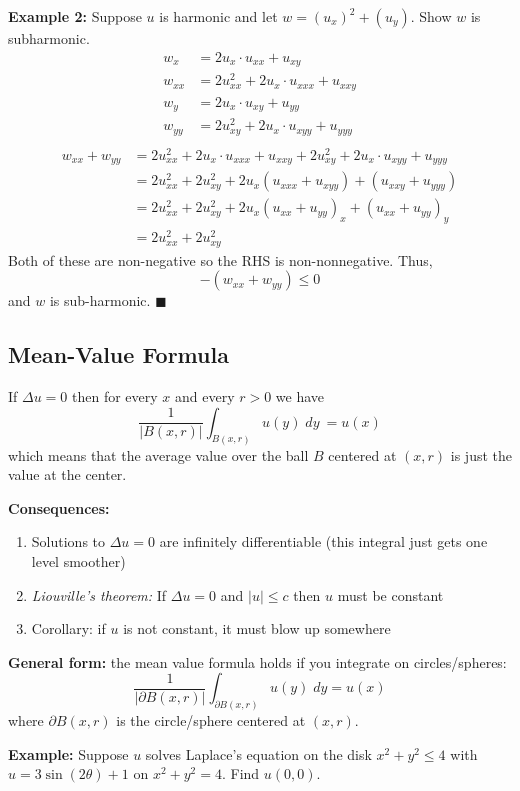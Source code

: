 \documentclass[10pt]{article}
\begin{document}
\textbf{Example 2:} Suppose $u$ is harmonic and let $w = (u_x)^2 + (u_y)$. Show $w$ is subharmonic.
\begin{align*}
    w_x &= 2u_x\cdot u_{xx} + u_{xy}\\
    w_{xx} &= 2u_{xx}^2 + 2u_x\cdot u_{xxx} + u_{xxy}\\
    w_y &= 2u_x\cdot u_{xy} + u_{yy}\\
    w_{yy}&= 2u_{xy}^2 + 2u_x\cdot u_{xyy} + u_{yyy}\\
\end{align*} 
\begin{align*}
    w_{xx} + w_{yy} &= 2u_{xx}^2 + 2u_x\cdot u_{xxx} + u_{xxy} + 2u_{xy}^2 + 2u_x\cdot u_{xyy} + u_{yyy}\\
    &= 2u_{xx}^2 + 2u_{xy}^2 + 2u_x(u_{xxx} + u_{xyy}) + (u_{xxy} + u_{yyy})\\
    &= 2u_{xx}^2 + 2u_{xy}^2 + 2u_x(u_{xx} + u_{yy})_x + (u_{xx} + u_{yy})_y\\
    &= 2u_{xx}^2 + 2u_{xy}^2
\end{align*}
Both of these are non-negative so the RHS is non-nonnegative. Thus, 
\[-(w_{xx} + w_{yy}) \leq 0\]
and $w$ is sub-harmonic. \quad $\blacksquare$

\subsection{Mean-Value Formula}
If $\Delta u =0$ then for every $x$ and every $r > 0$ we have 
\[\frac{1}{|B(x, r)|}\int_{B(x, r)} u(y)\; dy\ = u(x)\] 
which means that the average value over the ball $B$ centered at $(x,r)$ is just the value at the center. 

\textbf{Consequences:}
\begin{enumerate}
    \item Solutions to $\Delta u =0$ are infinitely differentiable (this integral just gets one level smoother)
    \item \emph{Liouville's theorem:} If $\Delta u= 0$ and $|u|\leq c$ then $u$ must be constant
    \item Corollary: if $u$ is not constant, it must blow up somewhere 
\end{enumerate}

\textbf{General form:} the mean value formula holds if you integrate on circles/spheres:
\[\frac{1}{|\partial B(x, r)|}\int_{\partial B(x, r)} u(y)\; dy = u(x)\]
where $\partial B(x, r)$ is the circle/sphere centered at $(x, r)$.  

\textbf{Example:} Suppose $u$ solves Laplace's equation on the disk $x^2 + y^2 \leq 4$ with $u = 3\sin(2\theta) + 1$ on $x^2 + y^2 = 4$. Find $u(0, 0)$. 
\end{document}

